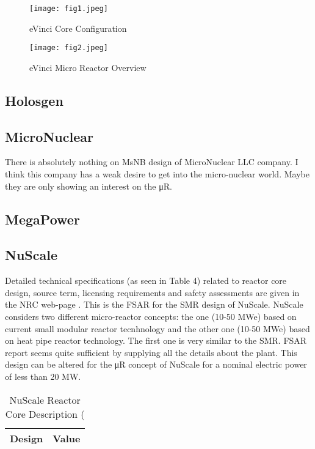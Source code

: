 \documentclass[10pt,a4paper]{article}
\begin{document}
\begin{figure}[hbtp]
\centering
\texttt{[image: fig1.jpeg]}
\caption{eVinci Core Configuration}
\end{figure}

\begin{figure}[hbtp]
\centering
\texttt{[image: fig2.jpeg]}
\caption{eVinci Micro Reactor Overview}
\end{figure}


\subsection{Holosgen}

\subsection{MicroNuclear}
There is absolutely nothing on MsNB design of MicroNuclear LLC company. I think this company has a weak desire to get into the micro-nuclear world. Maybe they are only showing an interest on the μR. 

\subsection{MegaPower}

\subsection{NuScale}
Detailed technical specifications (as seen in Table 4) related to reactor core design, source term, licensing requirements and safety assessments are given in the NRC web-page \cite{NuScale18}. This is the FSAR for the SMR design of NuScale. NuScale considers two different micro-reactor concepts: the one (10-50 MWe) based on current small modular reactor tecnhnology and the other one (10-50 MWe) based on heat pipe reactor technology. The first one is very similar to the SMR. FSAR report  seems quite sufficient by supplying all the details about the plant. This design can be altered for the μR concept of NuScale for a nominal electric power of less than 20 MW.

\begin{table} [ht]
\begin{center}

\caption{NuScale Reactor Core Description (\cite{NuScale18}}
\begin{tabular}{|l|l|}
\hline 
Design 		&Value \\ 
\hline 

\end{tabular}
\end{center}
\end{table}
\end{document}
